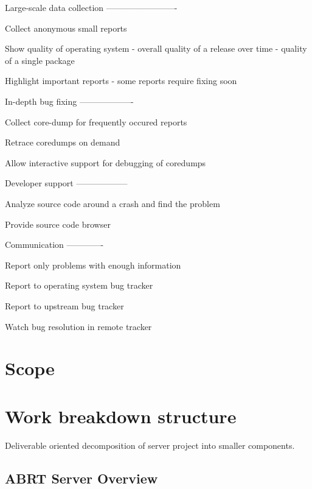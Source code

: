 \documentclass{article}
\begin{document}
Large-scale data collection
-------------------------

Collect anonymous small reports

Show quality of operating system
- overall quality of a release over time
- quality of a single package

Highlight important reports
- some reports require fixing soon


In-depth bug fixing
-------------------

Collect core-dump for frequently occured reports

Retrace coredumps on demand

Allow interactive support for debugging of coredumps


Developer support
------------------

Analyze source code around a crash and find the problem

Provide source code browser


Communication
-------------

Report only problems with enough information

Report to operating system bug tracker

Report to upstream bug tracker

Watch bug resolution in remote tracker


\section{Scope}

\section{Work breakdown structure}

Deliverable oriented decomposition of server project into smaller
components.

\subsection{ABRT Server Overview}
\end{document}
